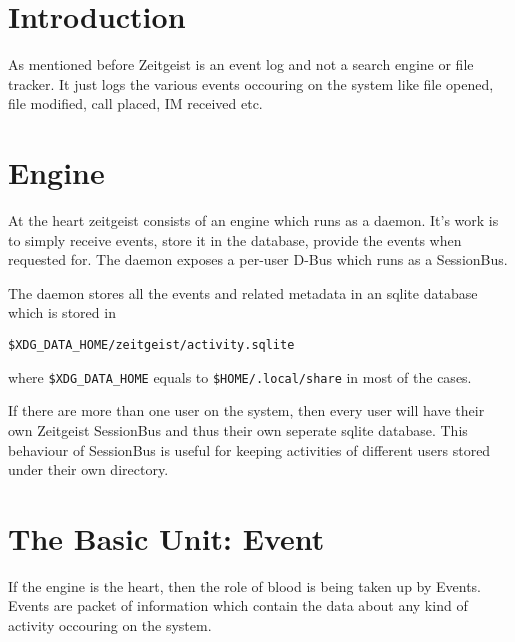 \section{Introduction}

As mentioned before Zeitgeist is an event log and not a search engine or 
file tracker. It just logs the various events occouring on the system 
like file opened, file modified, call placed, IM received etc.

\section{Engine}

At the heart zeitgeist consists of an engine which runs as a daemon. It's 
work is to simply receive events, store it in the database, provide the 
events when requested for. The daemon exposes a per-user D-Bus which runs 
as a SessionBus.


\noindent
\linebreak 
The daemon stores all the events and related metadata in an sqlite database 
which is stored in 

\texttt{\$XDG\_DATA\_HOME/zeitgeist/activity.sqlite}

\noindent
where \texttt{\$XDG\_DATA\_HOME} equals to \texttt{\$HOME/.local/share} in 
most of the cases.


\noindent
\linebreak 
If there are more than one user on the system, then every user will have 
their own Zeitgeist SessionBus and thus their own seperate sqlite database. 
This behaviour of SessionBus is useful for keeping activities of different 
users stored under their own directory.

\section{The Basic Unit: Event}

If the engine is the heart, then the role of blood is being taken up by Events. 
Events are packet of information which contain the data about any kind of activity 
occouring on the system.


